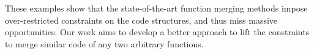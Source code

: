 

These examples show that the state-of-the-art function merging methods impose over-restricted constraints on the code structures, and thus
miss massive opportunities. Our work aims to develop a better approach to lift the constraints to merge similar code of any two arbitrary
functions.
